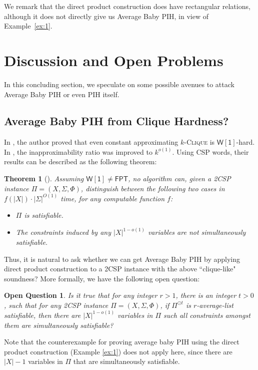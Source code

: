 \documentclass[10pt,a4paper]{article}
\newtheorem{theorem}{Theorem}
\newtheorem{question}{Open Question}
\newcommand{\wone}{\mathsf{W[1]}}
\newcommand{\fpt}{\mathsf{FPT}}
\newcommand{\kclique}{\textsc{$k$-Clique}}
\begin{document}
We remark that the direct product construction does have rectangular relations, although it does not directly give us Average Baby PIH, in view of Example~\ref{ex:1}.

\section{Discussion and Open Problems}
\label{sec:discuss}

In this concluding section, we speculate on some possible avenues to attack Average Baby PIH or even PIH itself.

\subsection{Average Baby PIH from Clique Hardness?}

In \cite{Lin21}, the author proved that even constant approximating \kclique{} is $\wone$-hard. In \cite{KK22,CFL+23}, the inapproximability ratio was improved to $k^{o(1)}$. Using CSP words, their results can be described as the following theorem:

\begin{theorem}[\cite{KK22,CFL+23}]
    Assuming $\wone\neq\fpt$, no algorithm can, given a 2CSP instance $\Pi=(X,\Sigma,\Phi)$, distinguish between the following two cases in $f(|X|)\cdot |\Sigma|^{O(1)}$ time, for any computable function $f$:
    \begin{itemize}
        \item $\Pi$ is satisfiable.
        \item The constraints induced by any $|X|^{1-o(1)}$ variables are not simultaneously satisfiable.
    \end{itemize}
\end{theorem}
 Thus, it is natural to ask whether we can get Average Baby PIH by applying direct product construction to a 2CSP instance with the above ``clique-like" soundness? More formally, we have the following open question:

\begin{question}
Is it true that for any integer $r>1$, there is an integer $t>0$, such that for any 2CSP instance $\Pi=(X,\Sigma,\Phi)$, if $\Pi^{\odot t}$ is $r$-average-list satisfiable, then there are $|X|^{1-o(1)}$ variables in $\Pi$ such all constraints amongst them are simultaneously satisfiable?
\end{question}

Note that the counterexample for proving average baby PIH using the direct product construction (Example \ref{ex:1}) does not apply here, since there are $|X|-1$ variables in $\Pi$ that are simultaneously satisfiable.
\end{document}
